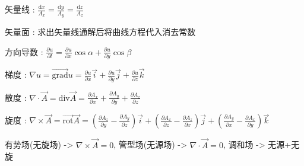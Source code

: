 \documentclass[UTF8, 12pt]{ctexart}
\begin{document}
	
	矢量线 : $\frac{\mathrm{d}x}{A_{x}} = \frac{\mathrm{d}y}{A_{y}} = \frac{\mathrm{d}z}{A_{z}} $

	矢量面 : 求出矢量线通解后将曲线方程代入消去常数

	方向导数 : $ \frac{\partial u}{\partial l} = \frac{\partial u}{\partial x}\cos\alpha + \frac{\partial u}{\partial y}\cos\beta $

	梯度 : $ \nabla u = \vec{\mathrm{grad}}u = \frac{\partial u}{\partial x}\vec{i} + \frac{\partial u}{\partial y}\vec{j} + \frac{\partial u}{\partial z}\vec{k} $

	散度 : $ \nabla \cdot \vec{A} = \mathrm{div}\vec{A} = \frac{\partial A_{x}}{\partial x} + \frac{\partial A_{y}}{\partial y} + \frac{\partial A_{z}}{\partial z} $

	旋度 : $ \nabla \times \vec{A} = \vec{\mathrm{rot}}\vec{A} = (\frac{\partial A_{z}}{\partial y} - \frac{\partial A_{y}}{\partial z})\vec{i} + (\frac{\partial A_{x}}{\partial z} - \frac{\partial A_{z}}{\partial x})\vec{j} + (\frac{\partial A_{y}}{\partial x} - \frac{\partial A_{x}}{\partial y})\vec{k} $

	有势场(无旋场) -> $ \nabla \times \vec{A} = 0 $, 管型场(无源场) -> $ \nabla \cdot \vec{A} = 0 $, 调和场 -> 无源+无旋
\end{document}
